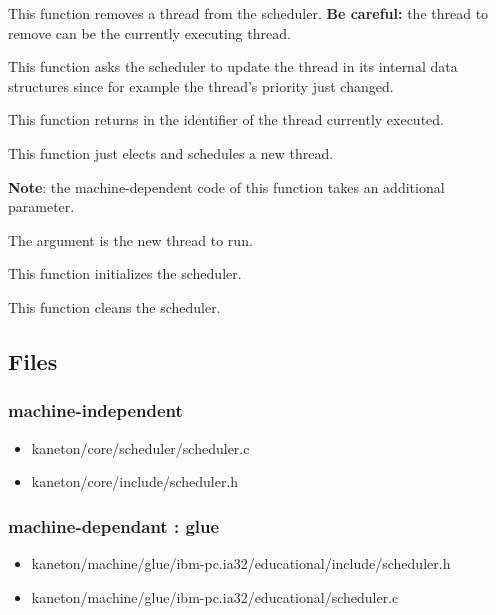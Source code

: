 {
  This function removes a thread from the
  scheduler. \textbf{Be careful:} the thread to remove can be
  the currently executing thread.
}

{
  This function asks the scheduler to update the thread
   in its internal data structures since
  for example the thread's priority just changed.
}

{
  This function returns in  the identifier
  of the thread currently executed.
}

{
  This function just elects and schedules a new thread.

  \textbf{Note}: the machine-dependent code of this function
  takes an additional parameter.

  {
    The argument  is the new
    thread to run.
  }
}

{
  This function initializes the scheduler.
}

{
  This function cleans the scheduler.
}

\subsection*{Files}

\subsubsection{\color{filerefcolor} machine-independent}
\begin{itemize}
\item kaneton/core/scheduler/scheduler.c
\item kaneton/core/include/scheduler.h
\end{itemize}

\subsubsection{\color{filerefcolor} machine-dependant : glue}
\begin{itemize}
\item kaneton/machine/glue/ibm-pc.ia32/educational/include/scheduler.h
\item kaneton/machine/glue/ibm-pc.ia32/educational/scheduler.c
\end{itemize}

